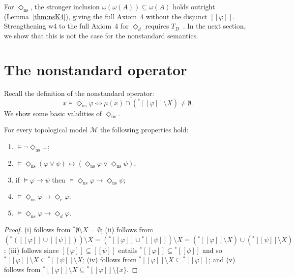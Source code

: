 \documentclass[submission,copyright,creativecommons]{eptcs}
\newcommand{\sem}[1]{[\![#1]\!]}
\newcommand{\diam}{\Diamond}
\newcommand{\str}{{{}^{*}\!}}
\newcommand{\lozengens}{\diam_\mathrm{ns}}
\begin{document}
For $\lozengens$, the stronger inclusion 
$\omega(\omega(A)) \subseteq \omega(A)$ holds outright 
(Lemma~\ref{thm:nsK4}), giving the full Axiom~4 without 
the disjunct $\sem{\varphi}$.
Strengthening w4 to the full Axiom~4 for $\diam_d$ requires 
$T_D$~\cite{Aull1962,BEG2005}.
In the next section, we show that this is not the case for 
the nonstandard semantics.

\section{The nonstandard operator}
\label{sec:ns-op}


Recall the definition of the nonstandard operator:
\[
  x \models \lozengens\varphi
  \iff
  \mu(x) \cap (\str\sem{\varphi} \setminus X) \neq \emptyset.
\]
We show some basic validities of $\lozengens$. 
\begin{proposition}
\label{prop:nsbasic}
For every topological model $\mathcal{M}$ the following properties hold:
\begin{enumerate}[label=\textup{(\roman*)}]
  \item $\models \neg\lozengens\bot$;
  \item $\models \lozengens(\varphi \vee \psi)
    \leftrightarrow (\lozengens\varphi \vee \lozengens\psi)$;
  \item if $\models \varphi \to \psi$ then
    $\models \lozengens\varphi \to \lozengens\psi$;
  \item $\models \lozengens\varphi \to \diam_c\varphi$;
  \item $\models \lozengens\varphi \to \diam_d\varphi$.
\end{enumerate}
\end{proposition}

\begin{proof}
(i) follows from $\str \emptyset \setminus X = \emptyset$;
(ii) follows from $(\str(\sem{\varphi} \cup \sem{\psi})) \setminus X
= (\str \sem{\varphi} \cup \str \sem{\psi}) \setminus X
= (\str \sem{\varphi} \setminus X) \cup (\str \sem{\psi} \setminus X)$;
(iii) follows since $\sem{\varphi} \subseteq \sem{\psi}$ entails $\str \sem{\varphi}
\subseteq \str \sem{\psi}$ and so $\str \sem{\varphi} \setminus X
\subseteq \str \sem{\psi} \setminus X$;
(iv) follows from $\str \sem{\varphi} \setminus X \subseteq \str \sem{\varphi}$; and
(v) follows from $\str \sem{\varphi} \setminus X \subseteq \str \sem{\varphi} \setminus \{x\}$.
\end{proof}
\end{document}
